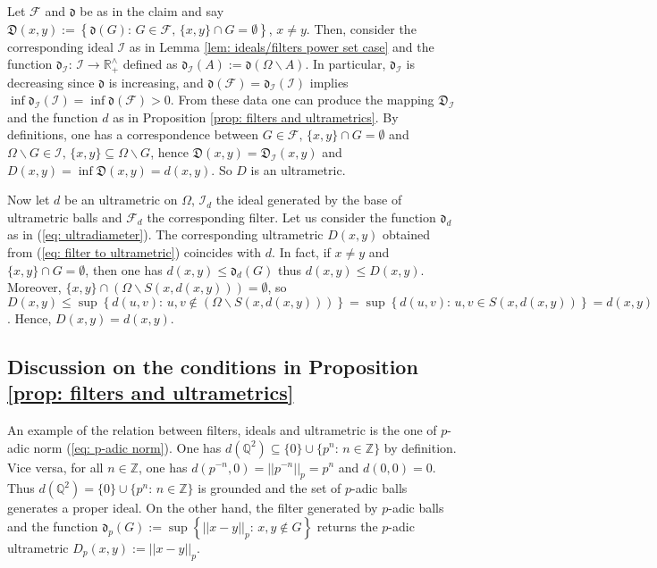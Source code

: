 \documentclass[11pt,british,reqno]{article}
\makeatletter
\numberwithin{equation}{section}
\numberwithin{figure}{section}
\numberwithin{table}{section}
\theoremstyle{definition}
\theoremstyle{definition}
\theoremstyle{plain}
\theoremstyle{plain}
\theoremstyle{remark}
\theoremstyle{plain}
\numberwithin{equation}{section}
\numberwithin{figure}{section}
\numberwithin{table}{section}
\theoremstyle{plain}
\renewenvironment{proof}[1][\proofname]{\par
  \pushQED{\qed}%
  \normalfont \topsep6\p@\@plus6\p@\relax
  \list{}{%
    \settowidth{\leftmargin}{\itshape\proofname:\hskip\labelsep}%
    \setlength{\labelwidth}{0pt}%
    \setlength{\itemindent}{-\leftmargin}%
  }%
  \item[\hskip\labelsep\itshape#1\@addpunct{:}]\ignorespaces
}{%
  \popQED\endlist\@endpefalse
}
\makeatother
\begin{document}
\begin{proof} 
Let $\mathcal{F}$ and $\mathfrak{d}$ be as in the claim and say
$\mathfrak{D}(x,y):=\left\{ \mathfrak{d}(G):\,G\in\mathcal{F},\,\{x,y\}\cap G=\emptyset\right\} $,
$x\neq y$. Then, consider the corresponding ideal $\mathcal{I}$
as in Lemma \ref{lem: ideals/filters power set case} and the function
$\mathfrak{d}_{\mathcal{I}}:\,\mathcal{I}\longrightarrow\mathbb{R}_{+}^{\wedge}$
defined as $\mathfrak{d}_{\mathcal{I}}(A):=\mathfrak{d}(\Omega\backslash A)$.
In particular, $\mathfrak{d}_{\mathcal{I}}$ is decreasing since $\mathfrak{d}$
is increasing, and $\mathfrak{d}(\mathcal{F})=\mathfrak{d}_{\mathcal{I}}(\mathcal{I})$
implies $\inf\mathfrak{d}_{\mathcal{I}}(\mathcal{I})=\inf\mathfrak{d}(\mathcal{F})>0$.
From these data one can produce the mapping $\mathfrak{D}_{\mathcal{I}}$
and the function $d$ as in Proposition \ref{prop: filters and ultrametrics}.
By definitions, one has a correspondence between $G\in\mathcal{F},\,\{x,y\}\cap G=\emptyset$
and $\Omega\backslash G\in\mathcal{I},\,\{x,y\}\subseteq\Omega\backslash G$,
hence $\mathfrak{D}(x,y)=\mathfrak{D}_{\mathcal{I}}(x,y)$ and $D(x,y)=\inf\mathfrak{D}(x,y)=d(x,y)$.
So $D$ is an ultrametric. 

Now let $d$ be an ultrametric on $\Omega$, $\mathcal{I}_{d}$ the
ideal generated by the base of ultrametric balls and $\mathcal{F}_{d}$
the corresponding filter. Let us consider the function $\mathfrak{d}_{d}$
as in (\ref{eq: ultradiameter}). The corresponding ultrametric $D(x,y)$
obtained from (\ref{eq: filter to ultrametric}) coincides with $d$.
In fact, if $x\neq y$ and $\{x,y\}\cap G=\emptyset$, then one has
$d(x,y)\leq\mathfrak{d}_{d}(G)$ thus $d(x,y)\leq D(x,y)$. Moreover,
$\{x,y\}\cap\left(\Omega\backslash S(x,d(x,y))\right)=\emptyset$,
so $D(x,y)\leq\sup\left\{ d(u,v):\,u,v\notin\left(\Omega\backslash S(x,d(x,y))\right)\right\} =\sup\left\{ d(u,v):\,u,v\in S(x,d(x,y))\right\} =d(x,y)$.
Hence, $D(x,y)=d(x,y)$.  
\end{proof}

\subsection{\label{subsec: Some remarks on the conditions in Proposition [filters and ultrametrics} Discussion on the conditions in Proposition \ref{prop: filters and ultrametrics}}

An example of the relation between filters, ideals and ultrametric
is the one of $p$-adic norm (\ref{eq: p-adic norm}). One has $d(\mathbb{Q}^{2})\subseteq\{0\}\cup\{p^{n}:\,n\in\mathbb{Z}\}$
by definition. Vice versa, for all $n\in\mathbb{Z}$, one has $d(p^{-n},0)=||p^{-n}||_{p}=p^{n}$
and $d(0,0)=0$. Thus $d(\mathbb{Q}^{2})=\{0\}\cup\{p^{n}:\,n\in\mathbb{Z}\}$
is grounded and the set of $p$-adic balls generates a proper ideal.
On the other hand, the filter generated by $p$-adic balls and the
function $\mathfrak{d}_{p}(G):=\sup\left\{ ||x-y||_{p}:\,x,y\notin G\right\} $
returns the $p$-adic ultrametric $D_{p}(x,y):=||x-y||_{p}$. 
\end{document}
